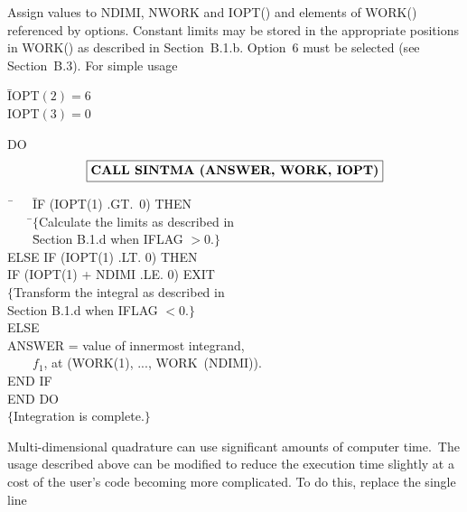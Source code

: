 \documentclass[twoside]{MATH77}
\begin{document}
Assign values to NDIMI, NWORK and IOPT() and elements of WORK() referenced
by options. Constant limits may be stored in the appropriate positions in
WORK() as described in Section~B.1.b. Option~6 must be selected (see
Section~B.3). For simple usage
\begin{tabbing}
\hspace{.2in}\=IOPT$(2) = 6$\\
\>IOPT$(3) = 0$
\end{tabbing}
\begin{center}
\end{center}
\hspace{.2in}DO
$$
\fbox{{\bf CALL SINTMA (ANSWER, WORK, IOPT)}}
$$
\begin{tabbing}
\hspace{.2in}\=\ \ \ \ \=IF (IOPT(1) .GT.\ 0) THEN\\

\>\>\ \ \ \ \=$\{$Calculate the limits as described in\\
\>\>\>\ \ \ \ \=Section B.1.d when IFLAG $>0.\}$\\

\>\>ELSE IF (IOPT(1) .LT. 0) THEN\\

\>\>\>IF (IOPT(1) + NDIMI .LE. 0) EXIT\\

\>\>\>$\{$Transform the integral as described in\\
\>\>\>\>Section B.1.d when IFLAG $<0.\}$\\

\>\>ELSE\\

\>\>\>ANSWER = value of innermost integrand,\\
\>\>\>\ \ \ \ $f_1$, at (WORK(1), ..., WORK\ (NDIMI)).\\

\>\>END IF\\

\>END DO\\

\>$\{$Integration is complete$.\}$
\end{tabbing}

Multi-dimensional quadrature can use significant amounts of computer time.\
The usage described above can be modified to reduce the execution time
slightly at a cost of the user's code becoming more complicated. To do
this, replace the single line
\end{document}
